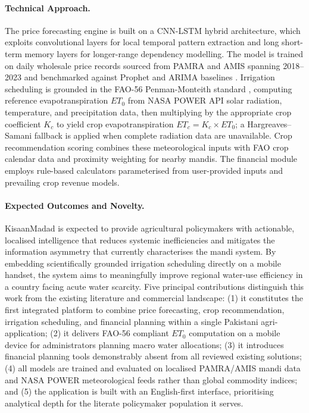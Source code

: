 \documentclass{FastFyp}
\begin{document}
\paragraph{Technical Approach.}
The price forecasting engine is built on a CNN-LSTM hybrid architecture, which exploits convolutional layers for local temporal pattern extraction and long short-term memory layers for longer-range dependency modelling. The model is trained on daily wholesale price records sourced from PAMRA and AMIS spanning 2018--2023 and benchmarked against Prophet and ARIMA baselines \cite{menculini2021comparing}. Irrigation scheduling is grounded in the FAO-56 Penman-Monteith standard \cite{allen1998crop}, computing reference evapotranspiration $ET_0$ from NASA POWER API solar radiation, temperature, and precipitation data, then multiplying by the appropriate crop coefficient $K_c$ to yield crop evapotranspiration $ET_c = K_c \times ET_0$; a Hargreaves--Samani fallback is applied when complete radiation data are unavailable. Crop recommendation scoring combines these meteorological inputs with FAO crop calendar data and proximity weighting for nearby mandis. The financial module employs rule-based calculators parameterised from user-provided inputs and prevailing crop revenue models.

\paragraph{Expected Outcomes and Novelty.}
KisaanMadad is expected to provide agricultural policymakers with actionable, localised intelligence that reduces systemic inefficiencies and mitigates the information asymmetry that currently characterises the mandi system. By embedding scientifically grounded irrigation scheduling directly on a mobile handset, the system aims to meaningfully improve regional water-use efficiency in a country facing acute water scarcity. Five principal contributions distinguish this work from the existing literature and commercial landscape: (1) it constitutes the first integrated platform to combine price forecasting, crop recommendation, irrigation scheduling, and financial planning within a single Pakistani agri-application; (2) it delivers FAO-56 compliant $ET_0$ computation on a mobile device for administrators planning macro water allocations; (3) it introduces financial planning tools demonstrably absent from all reviewed existing solutions; (4) all models are trained and evaluated on localised PAMRA/AMIS mandi data and NASA POWER meteorological feeds rather than global commodity indices; and (5) the application is built with an English-first interface, prioritising analytical depth for the literate policymaker population it serves.
\pagebreak
\end{document}
